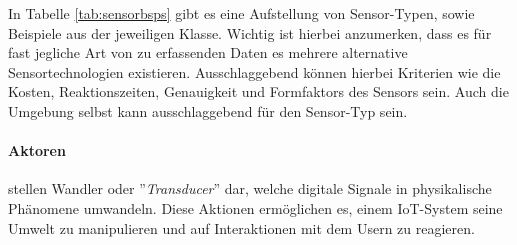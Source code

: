 \begin{table}[H]
\centering
\caption{Sensortypen und beispielhafte Vertreter. Obwohl sämtliche Sensoren analoge bzw. digitale Daten schicken, Sensoren können stark unterschiedliche Outputs besitzen. Tabelle angelehnt an \cite{lopez2011taxonomy}}
\label{tab:sensorbsps}
\end{table}

In Tabelle \ref{tab:sensorbsps} gibt es eine Aufstellung von Sensor-Typen, sowie Beispiele aus der jeweiligen Klasse. Wichtig ist hierbei anzumerken, dass es für fast jegliche Art von zu erfassenden Daten es mehrere alternative Sensortechnologien existieren. Ausschlaggebend können hierbei Kriterien wie die Kosten, Reaktionszeiten, Genauigkeit und Formfaktors des Sensors sein. Auch die Umgebung selbst kann ausschlaggebend für den Sensor-Typ sein.

\paragraph{Aktoren} stellen Wandler oder ''\textit{Transducer}'' dar, welche digitale Signale in physikalische Phänomene umwandeln. Diese Aktionen ermöglichen es, einem \ac{IoT}-System seine Umwelt zu manipulieren und auf Interaktionen mit dem Usern zu reagieren. 


